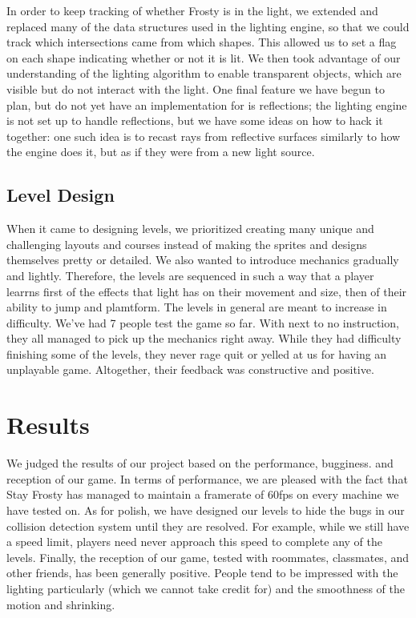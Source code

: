 \documentclass[11pt]{article} %
\begin{document}
In order to keep tracking of whether Frosty is in the light, we extended and replaced many of the data structures used in the lighting engine, so that we could track which intersections came from which shapes.  This allowed us to set a flag on each shape indicating whether or not it is lit.  We then took advantage of our understanding of the lighting algorithm to enable transparent objects, which are visible but do not interact with the light.  One final feature we have begun to plan, but do not yet have an implementation for is reflections; the lighting engine is not set up to handle reflections, but we have some ideas on how to hack it together: one such idea is to recast rays from reflective surfaces similarly to how the engine does it, but as if they were from a new light source.

\subsection{Level Design}

When it came to designing levels, we prioritized creating many unique and challenging layouts and courses instead of making the sprites and designs themselves pretty or detailed. We also wanted to introduce mechanics gradually and lightly. Therefore, the levels are sequenced in such a way that a player learrns first of the effects that light has on their movement and size, then of their ability to jump and plamtform. The levels in general are meant to increase in difficulty. We've had 7 people test the game so far. With next to no instruction, they all managed to pick up the mechanics right away. While they had difficulty finishing some of the levels, they never rage quit or yelled at us for having an unplayable game. Altogether, their feedback was constructive and positive.

\section{Results}

We judged the results of our project based on the performance, bugginess. and reception of our game.  In terms of performance, we are pleased with the fact that Stay Frosty has managed to maintain a framerate of 60fps on every machine we have tested on.  As for polish, we have designed our levels to hide the bugs in our collision detection system until they are resolved.  For example, while we still have a speed limit, players need never approach this speed to complete any of the levels.  Finally, the reception of our game, tested with roommates, classmates, and other friends, has been generally positive.  People tend to be impressed with the lighting particularly (which we cannot take credit for) and the smoothness of the motion and shrinking.
\end{document}
